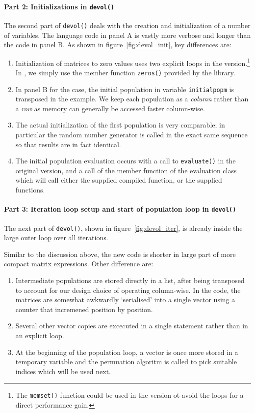 \documentclass[nojss,shortnames,article]{jss}
\begin{document}
\paragraph{Part 2: Initializations in \texttt{devol()}} The second part of
\verb|devol()| deals with the creation and initialization of a number of
variables.  The  language code in panel A is vastly more verbose
and longer than the  code in panel B. As shown in
figure~\ref{fig:devol_init}, key differences are:
\begin{enumerate}
\item Initialization of matrices to zero values uses two explicit loops in
  the  version.\footnote{The \texttt{memset()} function could be
    used in the  version ot avoid the loops for a direct
    performance gain.}  In , we simply use the member function
  \verb|zeros()| provided by the  library.
\item In panel B for the  case, the initial population in
  variable \texttt{initialpopm} is transposed in the 
  example. We keep each population as a \textsl{column} rather than a
  \textsl{row} as memory can generally be accessed faster column-wise.
\item The actual initialization of the first population is very comparable;
  in particular the  random number generator is called in the
  exact same sequence so that results are in fact identical.
\item The initial population evaluation occurs with a call to
  \verb|evaluate()| in the original version, and a call of the member
  function of the evaluation class which will call either the supplied
  compiled function, or the supplied  functions.
\end{enumerate}

\paragraph{Part 3: Iteration loop setup and start of population loop in \texttt{devol()}} 

The next part of \verb|devol()|, shown in
figure~\ref{fig:devol_iter}, is already inside the large outer loop over all iterations.

Similar to the discussion above, the new code is shorter in large part of
more compact matrix expressions. Other difference are:
\begin{enumerate}
\item Intermediate populations are stored directly in a list, after being
  transposed to account for our design choice of operating column-wise. In
  the  code, the matrices are somewhat awkwardly `serialised'
  into a single vector using a counter that incremened position by position.
\item Several other vector copies are excecuted in a single statement rather
  than in an explicit loop.
\item At the beginning of the population loop, a vector is once more stored
  in a temporary variable and the permuation algoritm is called to pick
  suitable indices which will be used next.
\end{enumerate}
\end{document}
